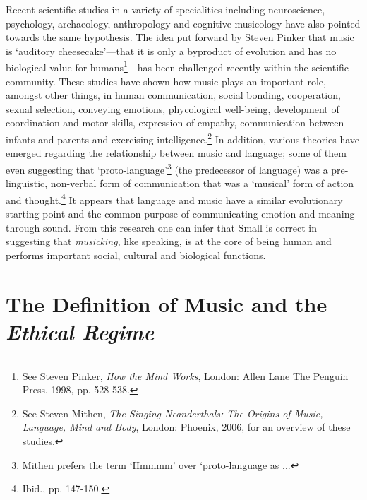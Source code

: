 Recent scientific studies in a variety of specialities including neuroscience, psychology, archaeology, anthropology and cognitive musicology have also pointed towards the same hypothesis. The idea put forward by Steven Pinker that music is `auditory cheesecake'---that it is only a byproduct of evolution and has no biological value for humans\footnote{See Steven Pinker, \emph{How the Mind Works}, London: Allen Lane The Penguin Press, 1998, pp. 528-538.}---has been challenged recently within the scientific community.  These studies have shown how music plays an important role, amongst other things, in human communication, social bonding, cooperation, sexual selection, conveying emotions, phycological \mbox{well-being}, development of coordination and motor skills, expression of empathy, communication between infants and parents and exercising intelligence.\footnote{See Steven Mithen, \emph{The Singing Neanderthals: The Origins of Music, Language, Mind and Body}, London: Phoenix, 2006, for an overview of these studies.} In addition, various theories have emerged regarding the relationship between music and language; some of them even suggesting that \mbox{`proto-language'}\footnote{Mithen prefers the term `Hmmmm' over `proto-language as ...} (the predecessor of language) was a pre-linguistic, non-verbal form of communication that was a `musical' form of action and thought.\footnote{Ibid., pp. 147-150.} It appears that language and music have a similar evolutionary \mbox{starting-point} and the common purpose of communicating emotion and meaning through sound. From this research one can infer that Small is correct in suggesting that \emph{musicking}, like speaking, is at the core of being human and performs important social, cultural and biological functions. 

\hypertarget{musdef}{}
\section{The Definition of Music and the \emph{Ethical Regime}}

